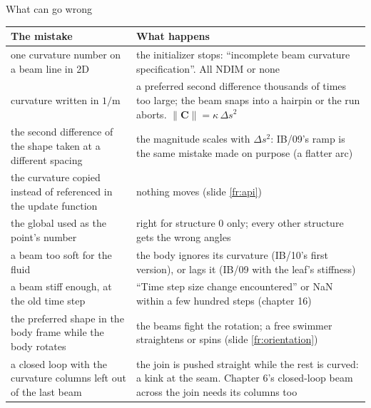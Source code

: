 \documentclass[aspectratio=169,11pt]{beamer}
\begin{document}
\begin{frame}{What can go wrong}
\label{fr:wrong}
\scriptsize
\begin{tabular}{@{}L{0.3\textwidth}L{0.62\textwidth}@{}}
\toprule
The mistake & What happens\\
\midrule
one curvature number on a beam line in 2D & the initializer stops: ``incomplete beam curvature specification''. All $\mathrm{NDIM}$ or none\\
curvature written in $1/\mathrm{m}$ & a preferred second difference thousands of times too large; the beam snaps into a hairpin or the run aborts. $\|\mathbf{C}\| = \kappa\,\Delta s^2$\\
the second difference of the shape taken at a different spacing & the magnitude scales with $\Delta s^2$: IB/09's ramp is the same mistake made on purpose (a flatter arc)\\
the curvature copied instead of referenced in the update function & nothing moves (slide \ref{fr:api})\\
the global  used as the point's number & right for structure 0 only; every other structure gets the wrong angles\\
a beam too soft for the fluid & the body ignores its curvature (IB/10's first version), or lags it (IB/09 with the leaf's stiffness)\\
a beam stiff enough, at the old time step & ``Time step size change encountered'' or NaN within a few hundred steps (chapter 16)\\
the preferred shape in the body frame while the body rotates & the beams fight the rotation; a free swimmer straightens or spins (slide \ref{fr:orientation})\\
a closed loop with the curvature columns left out of the last beam & the join is pushed straight while the rest is curved: a kink at the seam. Chapter 6's closed-loop beam across the join needs its columns too\\
\bottomrule
\end{tabular}
\end{frame}
\end{document}
